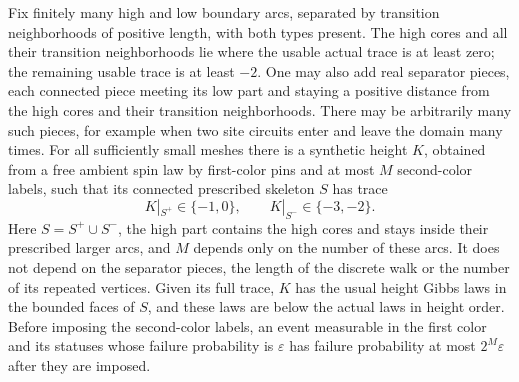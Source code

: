 \begin{lemma}\label{boundary:synthetic-trace}
Fix finitely many high and low boundary arcs, separated by transition
neighborhoods of positive length, with both types present.  The high
cores and all their transition neighborhoods lie where the usable actual
trace is at least zero; the remaining usable trace is at least $-2$.
One may also add real separator pieces, each connected piece meeting
its low part and staying a positive distance from the high cores and
their transition neighborhoods.  There may be arbitrarily many such
pieces, for example when two site circuits enter and leave the domain
many times.  For all sufficiently small meshes there is a synthetic
height $K$, obtained from a free
ambient spin law by first-color pins and at most $M$ second-color
labels, such that its connected prescribed skeleton $S$ has trace
\begin{equation}
 K|_{S^+}\in\{-1,0\},\qquad
 K|_{S^-}\in\{-3,-2\}.
 \label{boundary:synthetic-pairs}
\end{equation}
Here $S=S^+\cup S^-$, the high part contains the high cores and stays
inside their prescribed larger arcs, and $M$ depends only on the
number of these arcs.  It does not depend on the separator pieces, the
length of the discrete walk or the number of its repeated vertices.
Given its full trace, $K$ has the usual height Gibbs laws in the
bounded faces of $S$, and these laws are below the actual laws in
height order.  Before imposing the second-color labels, an event
measurable in the first color and its statuses whose failure
probability is $\varepsilon$ has failure probability at most
$2^M\varepsilon$ after they are imposed.
\end{lemma}

